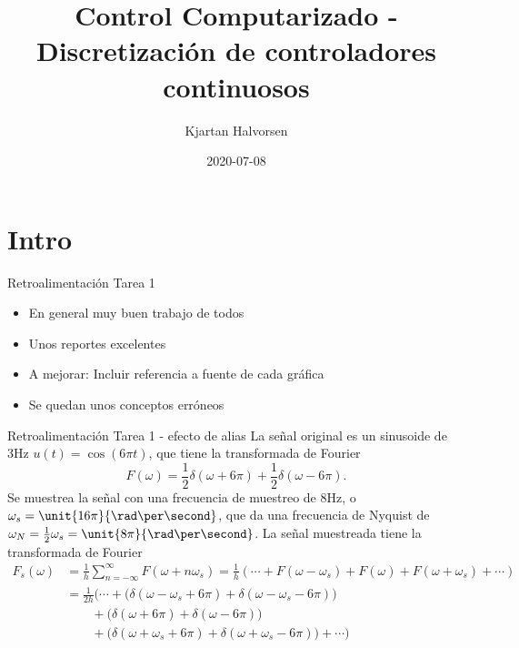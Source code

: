 \documentclass[presentation,aspectratio=1610]{beamer}
\author{Kjartan Halvorsen}
\date{2020-07-08}
\title{Control Computarizado - Discretización de controladores continuosos}
\begin{document}
\maketitle


\section{Intro}
\label{sec:orge0e4c3c}
\begin{frame}[label={sec:orgde90e12}]{Retroalimentación Tarea 1}
\begin{itemize}
\item En general \alert{muy buen trabajo} de todos
\item Unos \alert{reportes excelentes}
\item A mejorar: Incluir \alert{referencia a fuente} de cada gráfica
\item Se quedan unos conceptos erróneos
\end{itemize}
\end{frame}

\begin{frame}[label={sec:org551de8e}]{Retroalimentación Tarea 1 - efecto de alias}
 La señal original es un sinusoide de 3Hz \(u(t) = \cos(6\pi t)\),  que tiene la transformada de Fourier 
\[ F(\omega) = \frac{1}{2}\delta(\omega + 6\pi) + \frac{1}{2}\delta(\omega - 6\pi).\]
Se muestrea la señal con  una frecuencia de muestreo de 8Hz, o \(\omega_s = \unit{16\pi}{\rad\per\second}\), que da una frecuencia de Nyquist de \(\omega_N = \frac{1}{2} \omega_s = \unit{8\pi}{\rad\per\second}\). La señal muestreada tiene la transformada de Fourier
  \begin{align*}
   F_s(\omega) &= \frac{1}{h} \sum_{n=-\infty}^\infty F(\omega + n\omega_s) = \frac{1}{h} \left( \cdots + F(\omega - \omega_s) + F(\omega) + F(\omega + \omega_s) + \cdots \right)\\
&= \frac{1}{2h}\Big( \cdots + \big(\delta(\omega -\omega_s + 6\pi) + \delta(\omega -\omega_s - 6\pi)\big)\\& \qquad + \big(\delta(\omega + 6\pi) + \delta(\omega - 6\pi)\big)\\ & \qquad + \big(\delta(\omega +\omega_s + 6\pi) + \delta(\omega +\omega_s - 6\pi)\big) + \cdots \Big)
\end{align*} 
\end{frame}
\end{document}
